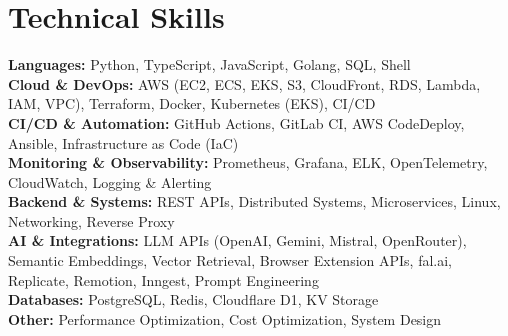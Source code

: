 \documentclass[letterpaper,11pt]{article}
\begin{document}
\section{Technical Skills}
\begin{itemize}[leftmargin=0.15in, label={}]
\small{\item{
\textbf{Languages:} Python, TypeScript, JavaScript, Golang, SQL, Shell \\
\textbf{Cloud \& DevOps:} AWS (EC2, ECS, EKS, S3, CloudFront, RDS, Lambda, IAM, VPC), Terraform, Docker, Kubernetes (EKS), CI/CD \\
\textbf{CI/CD \& Automation:} GitHub Actions, GitLab CI, AWS CodeDeploy, Ansible, Infrastructure as Code (IaC) \\
\textbf{Monitoring \& Observability:} Prometheus, Grafana, ELK, OpenTelemetry, CloudWatch, Logging \& Alerting \\
\textbf{Backend \& Systems:} REST APIs, Distributed Systems, Microservices, Linux, Networking, Reverse Proxy \\
\textbf{AI \& Integrations:} LLM APIs (OpenAI, Gemini, Mistral, OpenRouter), Semantic Embeddings, Vector Retrieval, Browser Extension APIs, fal.ai, Replicate, Remotion, Inngest, Prompt Engineering \\
\textbf{Databases:} PostgreSQL, Redis, Cloudflare D1, KV Storage \\
\textbf{Other:} Performance Optimization, Cost Optimization, System Design
}}
\end{itemize}
\end{document}
